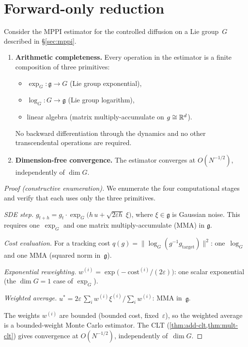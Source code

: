 \section{Forward-only reduction}\label{sec:forward-only}

\begin{proposition}
\label{prop:forward-only}
Consider the MPPI estimator for the controlled diffusion on a Lie group~$G$
described in \S\ref{sec:mppi}.
\begin{enumerate}[label=\textup{(\roman*)}]
\item \textbf{Arithmetic completeness.}
Every operation in the estimator is a finite composition of three primitives:
\begin{itemize}[nosep]
\item $\exp_G : \mathfrak{g} \to G$ \textup{(}Lie group exponential\textup{)},
\item $\log_G : G \to \mathfrak{g}$ \textup{(}Lie group logarithm\textup{)},
\item linear algebra \textup{(}matrix multiply-accumulate on
      $g \cong \mathbb{R}^d$\textup{)}.
\end{itemize}
No backward differentiation through the dynamics and no other transcendental
operations are required.
\item \textbf{Dimension-free convergence.}
The estimator converges at $O(N^{-1/2})$, independently of $\dim G$.
\end{enumerate}
\end{proposition}

\begin{proof}[Proof \textup{(}constructive enumeration\textup{)}]
We enumerate the four computational stages and verify that each uses only the
three primitives.

\medskip\noindent\emph{SDE step.}
$g_{t+h} = g_t \cdot \exp_G\!\bigl(h\,u + \sqrt{2\varepsilon h}\;\xi\bigr)$,
where $\xi \in \mathfrak{g}$ is Gaussian noise.
This requires one~$\exp_G$ and one matrix multiply-accumulate (MMA) in
$\mathfrak{g}$.

\medskip\noindent\emph{Cost evaluation.}
For a tracking cost $q(g) = \bigl\|\log_G(g^{-1}g_{\mathrm{target}})\bigr\|^2$:
one~$\log_G$ and one MMA (squared norm in~$\mathfrak{g}$).

\medskip\noindent\emph{Exponential reweighting.}
$w^{(i)} = \exp\!\bigl(-\mathrm{cost}^{(i)}/(2\varepsilon)\bigr)$:
one scalar exponential (the $\dim G = 1$ case of $\exp_G$).

\medskip\noindent\emph{Weighted average.}
$u^* = 2\varepsilon\,\sum_i w^{(i)}\xi^{(i)}\big/\sum_i w^{(i)}$:
MMA in~$\mathfrak{g}$.

\medskip\noindent
The weights $w^{(i)}$ are bounded (bounded cost, fixed~$\varepsilon$), so the
weighted average is a bounded-weight Monte Carlo estimator. The CLT
(\cref{thm:add-clt,thm:mult-clt}) gives convergence at $O(N^{-1/2})$,
independently of~$\dim G$.
\end{proof}

